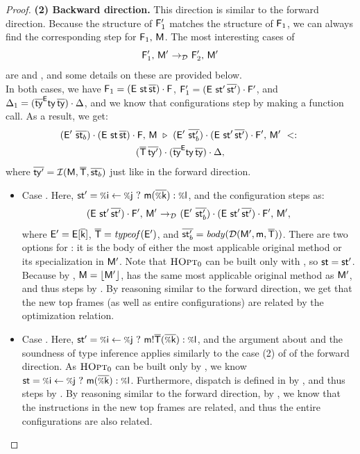 {\begin{proof}
{  \textbf{(2) Backward direction.}
  This direction is similar to the forward direction. Because the structure
  of $\mathsf{F}'_1$ matches the structure of $\mathsf{F}_1$, we can always find
  the corresponding step for $\mathsf{F}_1,\, \mathsf{M}$. The most interesting
  cases of
  \[
    \mathsf{F}'_1,\, \mathsf{M}' ~{\rightarrow_{\mathcal{D}}}~ \mathsf{F}'_2,\, \mathsf{M}'
  \]
  are  and , and some details on these are provided below.\\
  In both cases, we have
  $\frm_1 = \stk{(\env\ \st \,\ol{\st })}{\frm }$,
  $\mathsf{F}'_1 = (\mathsf{E}\ \mathsf{st}'\,\overline{\mathsf{st}'}) \cdot \mathsf{F}'$,
  and $\Delta_1 = (\overline{\mathsf{ty}}^{\mathsf{E}} \mathsf{ty}\,\overline{\mathsf{ty}}) \cdot \Delta$,
  and we know that configurations step by making a function call.
  As a result, we get:
  \begin{multline*}
    (\mathsf{E}'\ \overline{\mathsf{st}_b }) \cdot (\mathsf{E}\ \mathsf{st} \,\overline{\mathsf{st} }) \cdot \mathsf{F} ,\, \mathsf{M}\ \triangleright\ (\mathsf{E}'\ \overline{\mathsf{st}'_b}) \cdot (\mathsf{E}\ \mathsf{st}'\,\overline{\mathsf{st}'}) \cdot \mathsf{F}',\, \mathsf{M}'\ <:\ \\
      {(\overline{\mathsf{T}}\,\overline{\mathsf{ty}'}) \cdot (\overline{\mathsf{ty}}^{\mathsf{E}} \mathsf{ty}\,\overline{\mathsf{ty}}) \cdot \Delta},
  \end{multline*}
  where $\overline{\mathsf{ty}'} = \operatorname{\mathcal{I}}(\mathsf{M}, \overline{\mathsf{T}}, \overline{\mathsf{st}_b})$ just like
  in the forward direction.

  \begin{itemize}
    \item Case . Here, $\st' = \cond\i\j{\call\m{\ol{\v\k}}}{\v\l}$,
      and the configuration steps as:
      \[
        \config{\stk{(\env\ \st'\,\ol{\st'})}{\frm'}}{\mtbl'} \stepd
        \config{\stk{(\env'\ \ol{\st'_b})}{\stk{(\env\ \st'\,\ol{\st'})}{\frm'}}}{\mtbl'},
      \]
      where $\mathsf{E}' = \mathsf{E}[{\mathsf{\overline{\mathsf{k}}}}]$, $\overline{\mathsf{T}} = \operatorname{\mathit{typeof}}(\mathsf{E}')$, and
      $\overline{\mathsf{st}'_b} = \operatorname{\mathit{body}}(\operatorname{{\mathcal D}}(\mathsf{M}',\mathsf{\mathsf{m}},{\overline{\mathsf{T}}}))$.
      There are two options for : it is the body of either the
      most applicable original method or its specialization in $\mathsf{M}'$.
      Note that $\textsc{HOpt}_0$ can be built only with ,
      so $\mathsf{st} = \mathsf{st}'$. Because by , $\mathsf{M} = \lfloor \mathsf{M}' \rfloor$,
      \mtbl has the same most applicable original method as $\mathsf{M}'$,
      and thus  steps by .
      By reasoning similar to the forward direction, we get that
      the new top frames (as well as entire configurations) are related
      by the optimization relation.

    \item Case . Here,
      $\st' = \cond\i\j{\call{\msig{\m}{\ol\Ty}}{\ol{\v k}}}{\v\l}$,
      and the argument about  and the soundness of type inference
      applies similarly to the case (2) of  of the forward direction.
      As $\textsc{HOpt}_0$ can be built only by , we know
      $\st = \cond\i\j{\call\m{\ol{\v\k}}}{\v\l}$. Furthermore, dispatch is
      defined in \mtbl by , and thus 
      steps by . By reasoning similar to the forward direction,
      by , we know that the instructions in the new top frames are
      related, and thus the entire configurations are also related.
  \end{itemize}
}
\end{proof}

}
